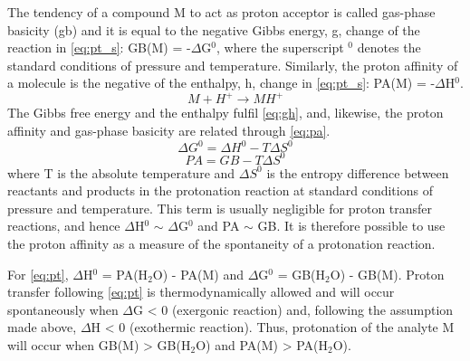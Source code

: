 The tendency of a compound M to act as proton acceptor is called gas-phase basicity (\acrshort{gb}) and it is equal to the negative Gibbs energy, \acrshort{g}, change of the  reaction in \autoref{eq:pt_s}: GB(M) = -$\Delta$G$^0$, where the superscript $^0$ denotes the standard conditions of pressure and temperature. Similarly, the proton affinity of a molecule is the negative of the enthalpy, \acrshort{h}, change in \autoref{eq:pt_s}: PA(M) = -$\Delta$H$^0$.
%
\begin{equation}
\label{eq:pt_s}
M + H^+  \rightarrow MH^+
\end{equation}
%
The Gibbs free energy and the enthalpy fulfil \autoref{eq:gh}, and, likewise, the proton affinity and gas-phase basicity are related through \autoref{eq:pa}.
%
\begin{equation}
\label{eq:gh}
\Delta G^0 = \Delta H^0 - T\Delta S^0
\end{equation}
%
\begin{equation}
\label{eq:pa}
PA = GB - T\Delta S^0
\end{equation}
where T is the absolute temperature and $\Delta S^0$ is the entropy difference between reactants and products in the protonation reaction at standard conditions of pressure and temperature.
This term  is usually negligible for  proton transfer reactions, and hence $\Delta$H$^0$ $\sim$ $\Delta$G$^0$ and PA $\sim$ GB.
It is therefore possible to use the proton affinity as a measure of the spontaneity of a protonation reaction.

For \autoref{eq:pt}, $\Delta$H$^0$ = PA(H$_2$O) - PA(M) and $\Delta$G$^0$ = GB(H$_2$O) - GB(M).
Proton transfer following \autoref{eq:pt} is thermodynamically allowed and will occur spontaneously when  $\Delta$G < 0 (exergonic reaction) and, following the assumption made above, $\Delta$H < 0 (exothermic reaction). Thus, protonation of the analyte M will occur when
GB(M) > GB(H$_2$O)
and
PA(M) > PA(H$_2$O).








